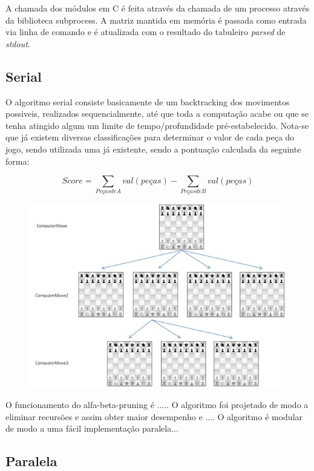 \documentclass[12pt,a4paper,final]{article}
\begin{document}
A chamada dos módulos em C é feita através da chamada de um processo através da biblioteca subprocess. A matriz mantida em memória é passada como entrada via linha de comando e é atualizada com o resultado do tabuleiro \textit{parsed} de \textit{stdout}.

\subsection{Serial}

O algoritmo serial consiste basicamente de um backtracking dos movimentos possiveis, realizados sequencialmente, até que toda a computação acabe ou que se tenha atingido algum um limite de tempo/profundidade pré-estabelecido. Nota-se que já existem diversas classificações para determinar o valor de cada peça do jogo, sendo utilizada uma já existente, sendo a pontuação calculada da seguinte forma:

\begin{equation}
Score = \sum_{Peças de A} val(peças) - \sum_{Peças de B} val(peças)
\end{equation}

\begin{figure}[H]
\centering
\includegraphics[scale=1]{../presentation/huoChess_2.jpg}
\end{figure}

O funcionamento do alfa-beta-pruning é .....
O algoritmo foi projetado de modo a eliminar recursões e assim obter maior desempenho e ....
O algoritmo é modular de modo a uma fácil implementação paralela...

\subsection{Paralela}
\end{document}
